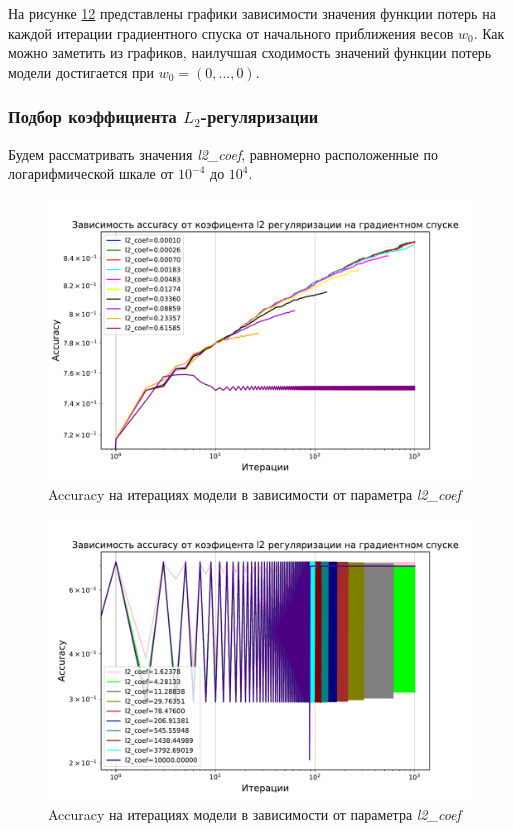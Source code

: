 \documentclass[14pt]{extarticle}
\begin{document}
На рисунке \hyperref[fig:exp_4_loss_alpha_1]{12} представлены графики зависимости значения функции потерь на каждой итерации градиентного спуска от начального приближения весов \textit{$ w_0 $}. Как можно заметить из графиков, наилучшая сходимость значений функции потерь модели достигается при \textit{$ w_0 = (0, ... , 0)$}.

\subsubsection{Подбор коэффициента $L_2$-регуляризации}

Будем рассматривать значения \textit{l2\_coef}, равномерно расположенные по логарифмической шкале от $ 10^{-4} $ до $ 10^{4} $.

\begin{figure}[H]
    \centering
    \includegraphics[width=0.7\linewidth]
    {exp_4_acc_l2_1.pdf}
    \caption{Accuracy на итерациях модели в зависимости от параметра \textit{l2\_coef}}
    \label{fig:exp_4_acc_l2_1}
\end{figure}

\begin{figure}[H]
    \centering
    \includegraphics[width=0.7\linewidth]
    {exp_4_acc_l2_2.pdf}
    \caption{Accuracy на итерациях модели в зависимости от параметра \textit{l2\_coef}}
    \label{fig:exp_4_acc_l2_2}
\end{figure}
\end{document}
